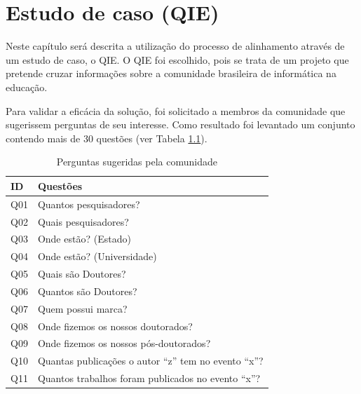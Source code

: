 \chapter{Estudo de caso (QIE)}
Neste capítulo será descrita a utilização do processo de alinhamento através de um estudo de caso, o QIE. O QIE foi escolhido, pois se trata de um projeto que pretende cruzar informações sobre a comunidade brasileira de informática na educação.

Para validar a eficácia da solução, foi solicitado a membros da comunidade que sugerissem perguntas de seu interesse. Como resultado foi levantado um conjunto contendo mais de 30 questões (ver Tabela \ref{tab:questions}).

\begin{table}[!ht]
\centering
\caption{Perguntas sugeridas pela comunidade}
\label{tab:questions}
\begin{tabular}{|l|l|}
\hline
ID  & Questões                                                                          \\ \hline
Q01 & Quantos pesquisadores?                                                            \\ \hline
Q02 & Quais pesquisadores?                                                              \\ \hline
Q03 & Onde estão? (Estado)                                                              \\ \hline
Q04 & Onde estão? (Universidade)                                                        \\ \hline
Q05 & Quais são Doutores?                                                               \\ \hline
Q06 & Quantos são Doutores?                                                             \\ \hline
Q07 & Quem possui marca?                                                                \\ \hline
Q08 & Onde fizemos os nossos doutorados?                                                \\ \hline
Q09 & Onde fizemos os nossos pós-doutorados?                                            \\ \hline
Q10 & Quantas publicações o autor “z” tem no evento “x”?                                \\ \hline
Q11 & Quantos trabalhos foram publicados no evento “x”?                                 \\ \hline

\end{tabular}
\end{table}
